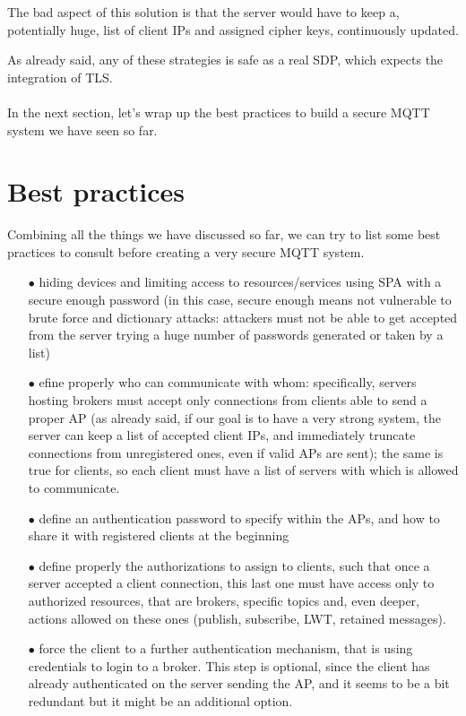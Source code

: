 \documentclass[12pt]{report}
\begin{document}
{\begin{itemize}
The bad aspect of this solution is that the server would have to keep a, potentially huge, list of client IPs and assigned cipher keys, continuously updated.\\
\end{itemize}

As already said, any of these strategies is safe as a real SDP, which expects the integration of TLS.\\\\

In the next section, let's wrap up the best practices to build a secure MQTT system we have seen so far.\\

\section{Best practices}
\bigskip
Combining all the things we have discussed so far, we can try to list some best practices to consult before creating a very secure MQTT system.
\bigskip
\begin{itemize}
\setlength{\itemindent}{+4mm}
\item[$\bullet$] hiding devices and limiting access to resources/services using SPA with a secure enough password (in this case, secure enough means not vulnerable to brute force and dictionary attacks: attackers must not be able to get accepted from the server trying a huge number of passwords generated or taken by a list)
\item[$\bullet$] efine properly who can communicate with whom: specifically, servers hosting brokers must accept only connections from clients able to send a proper AP (as already said, if our goal is to have a very strong system, the server can keep a list of accepted client IPs, and immediately truncate connections from unregistered ones, even if valid APs are sent); the same is true for clients, so each client must have a list of servers with which is allowed to communicate.
\item[$\bullet$] define an authentication password to specify within the APs, and how to share it with registered clients at the beginning
\item[$\bullet$] define properly the authorizations to assign to clients, such that once a server accepted a client connection, this last one must have access only to authorized resources, that are brokers, specific topics and, even deeper, actions allowed on these ones (publish, subscribe, LWT, retained messages).
\item[$\bullet$] force the client to a further authentication mechanism, that is using credentials to login to a broker. This step is optional, since the client has already authenticated on the server sending the AP, and it seems to be a bit redundant but it might be an additional option.

\end{itemize}}
\end{document}

